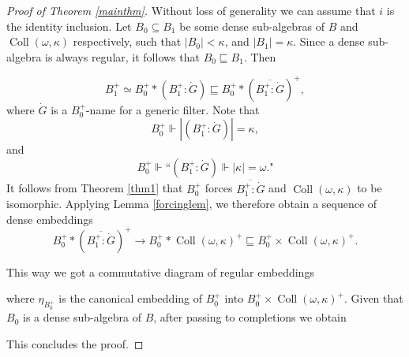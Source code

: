 \documentclass[11pt]{amsart}
\theoremstyle{definition}
\DeclareMathOperator{\B}{\mathcal B}
\begin{document}
\begin{proof}[Proof of Theorem \ref{mainthm}]
	Without loss of generality we can assume that $i$ is the identity inclusion. Let $B_0 \subseteq B_1$ be some dense sub-algebras of $B$ and  $\operatorname{Coll}(\omega,\kappa)$ respectively, such that $|B_0|<\kappa$, and $|B_1|=\kappa$. Since a dense sub-algebra is always regular, it follows that $B_0\sqsubseteq B_1$. Then
	
	$$B_1^+ \simeq B_0^+ \ast (B_1^+:\dot{G}) \sqsubseteq B_0^+\ast (\overline{B_1^+:\dot{G}})^+,$$
	where $\dot{G}$ is a $B_0^+$-name for a generic filter.
	Note that
	$$B_0^+ \Vdash |(B_1^+:\dot{G})|=\kappa,$$
	and
	$$B_0^+ \Vdash \text{``} (B_1^+:\dot{G}) \Vdash |\kappa|=\omega. \text{"}$$
	It follows from Theorem \ref{thm1} that $B_0^+$ forces $\overline{B_1^+:\dot{G}}$ and 
	$\operatorname{Coll}(\omega,\kappa)$ to be isomorphic. Applying Lemma \ref{forcinglem}, we therefore obtain a sequence of dense embeddings
	$$B_0^+\ast (\overline{B_1^+:\dot{G}})^+ \longrightarrow B_0^+ \ast \operatorname{Coll}(\omega,\kappa)^+ \sqsubseteq B_0^+\times \operatorname{Coll}(\omega,\kappa)^+.$$
	
	This way we got a commutative diagram of regular embeddings
	
	\begin{center}
	\end{center}
	where $\eta_{B_0^+}$ is the canonical embedding of $B_0^+$
	into $B_0^+\times \operatorname{Coll}(\omega,\kappa)^+$. Given that $B_0$ is a dense sub-algebra of $B$, after passing to completions we obtain

	\begin{center}
	\end{center}
This concludes the proof.
\end{proof}
\end{document}
